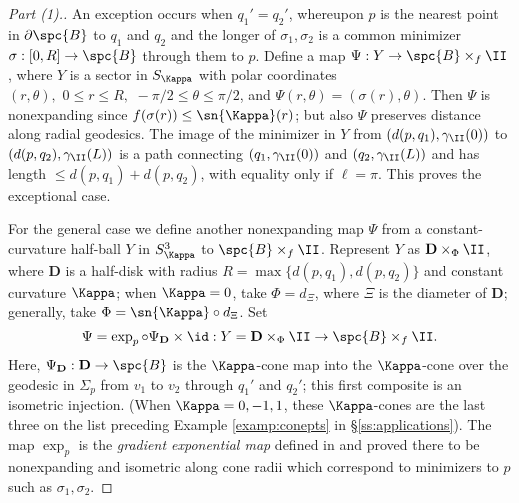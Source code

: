 \begin{proof}[Part (1).]
An exception occurs when $q_1' = q_2'$, whereupon $p$ is the nearest
point in $\partial \spc{B}$ to $q_1$ and $q_2$ and the longer of $\sigma_1,
\sigma_2$ is a common minimizer $\sigma: [0, R] \to \spc{B}$ through them to
$p$.  Define a map $\Psi : Y \to \spc{B}
\times_f \II$, where $Y$ is a sector in $S_{\Kappa}$ with polar
coordinates $(r, \theta),\,\,0\le r\le
R,\,\,-\pi/2\le\theta\le\pi/2$, and $\Psi(r,\theta) =
(\sigma(r),\theta)$. Then $\Psi$ is nonexpanding since
$f(\sigma(r)) \le \sn{\Kappa}(r)$; but also $\Psi$
preserves distance along radial geodesics. The image of the minimizer in $Y$
from $(d(p,q_1), \gamma_\II(0))$ to $(d(p,q_2), \gamma_\II(L))$ is a path
connecting $(q_1, \gamma_\II(0))$ and $(q_2, \gamma_\II(L))$ and has
length $\le d(p,q_1) +
d(p,q_2)$, with equality only if $\ell = \pi$. This proves the
exceptional case.

For the general case we define another nonexpanding map $\Psi$ from a
constant-curvature half-ball $Y$ in $S^3_{\Kappa}$ to $\spc{B} \times_f \II$.
Represent $Y$
as $\mathbf{D} \times_\Phi \II$, where $\mathbf{D}$ is
a half-disk with radius $R = \max\{d(p,q_1), d(p, q_2)\}$ and
constant curvature $\Kappa$; when $\Kappa = 0$, take $\Phi = d_\Xi$, where $\Xi$
is the diameter of $\mathbf{D}$; generally, take $\Phi =
\sn{\Kappa}\circ d_\Xi$.  Set
$$\Psi = \exp_p\circ\Psi_\mathbf{D} \times \id:Y=\mathbf{D}
\times_\Phi \II \to \spc{B}\times_f\II.$$
Here, $\Psi_\mathbf{D}:\mathbf{D}\to \spc{B}$ is
the $\Kappa$-cone map into the $\Kappa$-cone over the geodesic in $\Sigma_p$
from $v_1$ to $v_2$ through $q_1'$ and $q_2'$; this first composite is
an isometric injection. (When $\Kappa =0, -1, 1$, these $\Kappa$-cones are
the last three on the list preceding Example \ref{examp:conepts} in
\S \ref{ss:applications}). The map $\exp_p$ is the \emph{gradient
exponential map} defined in \cite{PP} and proved there to be
nonexpanding and isometric along cone radii which correspond to
minimizers to $p$ such as $\sigma_1, \sigma_2$.


\end{proof}
